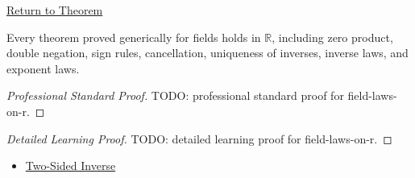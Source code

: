 \newpage
{}
\label{prf:field-laws-on-r}

\begin{remark*}[Return]
\hyperref[cor:field-laws-on-r]{Return to Theorem}
\end{remark*}

\begin{corollary*}
Every theorem proved generically for fields holds in $\mathbb{R}$, including
zero product, double negation, sign rules, cancellation, uniqueness of
inverses, inverse laws, and exponent laws.
\end{corollary*}

\begin{proof}[Professional Standard Proof]
\LRAProofBodyStart
TODO: professional standard proof for field-laws-on-r.
\end{proof}

\begin{proof}[Detailed Learning Proof]
\LRAProofBodyStart
TODO: detailed learning proof for field-laws-on-r.
\end{proof}

\begin{remark*}
\end{remark*}

\begin{dependencies}
\begin{itemize}
  \item \hyperref[def:two-sided-inverse]{Two-Sided Inverse}
\end{itemize}
\end{dependencies}

\clearpage
